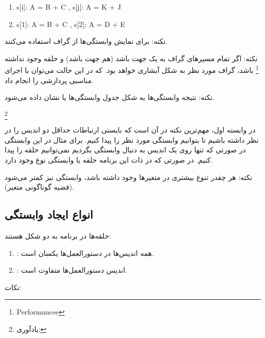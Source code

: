 \documentclass[20pt, a4paper]{article}
\begin{document}
\begin{enumerate}
    \item s[i]: A = B + C , s[j]: A = K + J
    \item s[1]: A = B + C , s[2]: A = D + E
\end{enumerate}

نکته: برای نمایش وابستگی‌ها از گراف استفاده می‌کنند.

نکته: اگر تمام مسیر‌های گراف به یک جهت باشد (هم جهت باشد) و حلقه وجود نداشته
\footnote{Performancee} باشد، گراف مورد نظر به شکل آبشاری خواهد بود. که در این
حالت می‌توان با اجرای مناسبی پردازشی را انجام داد.


نکته: نتیجه وابستگی‌ها به شکل جدول وابستگی‌ها یا  نشان
داده می‌شود.


\footnote{ یادآوری:}


در وابسته اول، مهم‌ترین نکته در آن است که بایستی ارتباطات حداقل دو اندیس را در
نظر داشته باشیم تا بتوانیم وابستگی مورد نظر را پیدا کنیم. برای مثال در این
وابستگی در صورتی که تنها روی یک اندیس به دنبال وابستگی بگردیم نمی‌توانیم حلقه را
پیدا کنیم. در صورتی که در ذات این برنامه حلقه یا وابستگی نوع  وجود دارد.




نکته: هر چقدر تنوع بیشتری در متغیر‌ها وجود داشته باشد، وابستگی نیز کمتر می‌شود
(فضیه گوناگونی متغیر).

\subsection{انواع ایجاد وابستگی}

حلقه‌ها در برنامه به دو شکل هستند:

\begin{enumerate}
    \item {}: همه اندیس‌ها در دستورالعمل‌ها یکسان است.
    \item {}: اندیس دستورالعمل‌ها متفاوت است.
\end{enumerate}

نکات:
\end{document}
